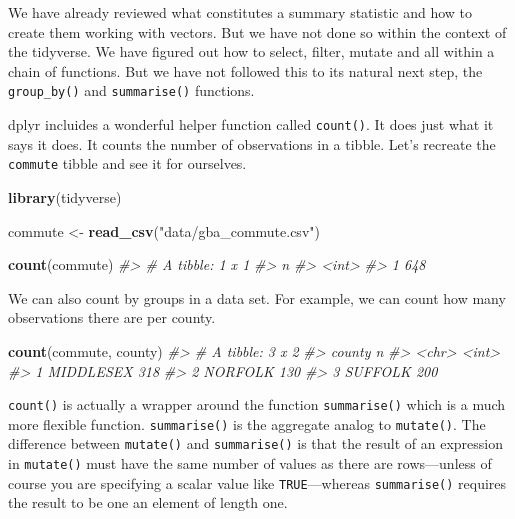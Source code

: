 \documentclass[
]{book}
\newenvironment{Shaded}{\begin{snugshade}}{\end{snugshade}}
\newcommand{\CommentTok}[1]{\textcolor[rgb]{0.56,0.35,0.01}{\textit{#1}}}
\newcommand{\KeywordTok}[1]{\textcolor[rgb]{0.13,0.29,0.53}{\textbf{#1}}}
\newcommand{\NormalTok}[1]{#1}
\newcommand{\StringTok}[1]{\textcolor[rgb]{0.31,0.60,0.02}{#1}}
\begin{document}
We have already reviewed what constitutes a summary statistic and how to create them working with vectors. But we have not done so within the context of the tidyverse. We have figured out how to select, filter, mutate and all within a chain of functions. But we have not followed this to its natural next step, the \texttt{group\_by()} and \texttt{summarise()} functions.

dplyr incluides a wonderful helper function called \texttt{count()}. It does just what it says it does. It counts the number of observations in a tibble. Let's recreate the \texttt{commute} tibble and see it for ourselves.

\begin{Shaded}
\begin{Highlighting}[]
\KeywordTok{library}\NormalTok{(tidyverse)}

\NormalTok{commute \textless{}{-}}\StringTok{ }\KeywordTok{read\_csv}\NormalTok{(}\StringTok{"data/gba\_commute.csv"}\NormalTok{) }

\KeywordTok{count}\NormalTok{(commute)}
\CommentTok{\#\textgreater{} \# A tibble: 1 x 1}
\CommentTok{\#\textgreater{}       n}
\CommentTok{\#\textgreater{}   \textless{}int\textgreater{}}
\CommentTok{\#\textgreater{} 1   648}
\end{Highlighting}
\end{Shaded}

We can also count by groups in a data set. For example, we can count how many observations there are per county.

\begin{Shaded}
\begin{Highlighting}[]
\KeywordTok{count}\NormalTok{(commute, county)}
\CommentTok{\#\textgreater{} \# A tibble: 3 x 2}
\CommentTok{\#\textgreater{}   county        n}
\CommentTok{\#\textgreater{}   \textless{}chr\textgreater{}     \textless{}int\textgreater{}}
\CommentTok{\#\textgreater{} 1 MIDDLESEX   318}
\CommentTok{\#\textgreater{} 2 NORFOLK     130}
\CommentTok{\#\textgreater{} 3 SUFFOLK     200}
\end{Highlighting}
\end{Shaded}

\texttt{count()} is actually a wrapper around the function \texttt{summarise()} which is a much more flexible function. \texttt{summarise()} is the aggregate analog to \texttt{mutate()}. The difference between \texttt{mutate()} and \texttt{summarise()} is that the result of an expression in \texttt{mutate()} must have the same number of values as there are rows---unless of course you are specifying a scalar value like \texttt{TRUE}---whereas \texttt{summarise()} requires the result to be one an element of length one.
\end{document}
